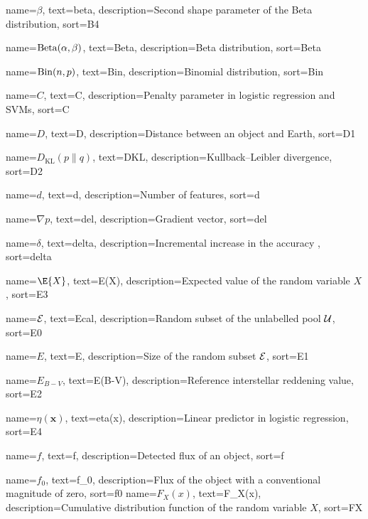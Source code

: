 %
{%
    name={$\beta$},
    text={beta},
    description={Second shape parameter of the Beta distribution},
    sort={B4}
}

%
{%
    name={$\operatorname{Beta}(\alpha, \beta)$},
    text={Beta},
    description={Beta distribution},
    sort={Beta}
}

%
{%
    name={$\operatorname{Bin}(n, p)$},
    text={Bin},
    description={Binomial distribution},
    sort={Bin}
}

%
{%
    name={$C$},
    text={C},
    description={Penalty parameter in logistic regression and SVMs},
    sort={C}
}

%
{%
	name={$D$},
	text={D},
	description={Distance between an object and Earth},
	sort={D1}
}

%
{%
    name={$D_{\mathrm{KL}}(p\|q)$},
    text={DKL},
    description={Kullback--Leibler divergence},
    sort={D2}
}

%
{%
    name={$d$},
    text={d},
    description={Number of features},
    sort={d}
}

%
{%
    name={$\nabla p$},
    text={del},
    description={Gradient vector},
    sort={del}
}

%
{%
    name={$\delta$},
    text={delta},
    description={Incremental increase in the accuracy },
    sort={delta}
}


%
{%
	name={$\E{X}$},
	text={E(X)},
	description={Expected value of the random variable $X$},
	sort={E3}
}

%
{%
    name={$\mathcal{E}$},
    text={Ecal},
    description={Random subset of the unlabelled pool $\mathcal{U}$},
    sort={E0}
}


%
{%
    name={$E$},
    text={E},
    description={Size of the random subset $\mathcal{E}$},
    sort={E1}
}

%
{%
	name={$E_{B-V}$},
	text={E(B-V)},
	description={Reference interstellar reddening value},
	sort={E2}
}

%
{%
    name={$\eta(\bm{x})$},
    text={eta(x)},
    description={Linear predictor in logistic regression},
    sort={E4}
}

%
{%
	name={$f$},
	text={f},
	description={Detected flux of an object},
	sort={f}
}

%
{%
	name={$f_0$},
	text={f_0},
	description={Flux of the object with a conventional magnitude of zero},
	sort={f0}
}
%
{%
	name={$F_X(x)$},
	text={F_X(x)},
	description={Cumulative distribution function of the random variable $X$},
	sort={FX}
}

